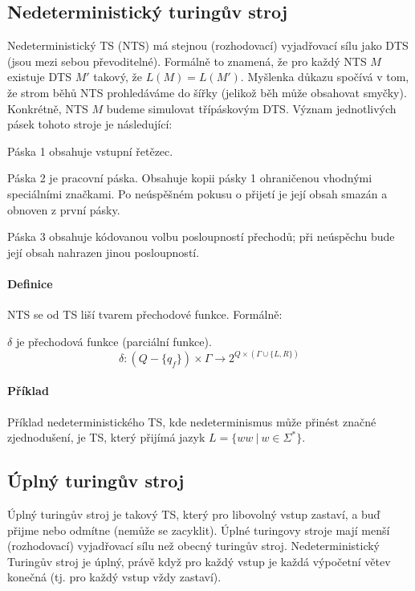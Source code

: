 \subsection{Nedeterministický turingův stroj}

Nedeterministický TS (NTS) má stejnou (rozhodovací) vyjadřovací sílu jako DTS (jsou mezi sebou převoditelné). Formálně to znamená, že pro každý NTS $M$ existuje DTS $M'$ takový, že $L(M) = L(M')$. Myšlenka důkazu spočívá v tom, že strom běhů NTS prohledáváme do šířky (jelikož běh může obsahovat smyčky). Konkrétně, NTS $M$ budeme simulovat třípáskovým DTS. Význam jednotlivých pásek tohoto
stroje je následující: \begin{compactitem}
    \item Páska 1 obsahuje vstupní řetězec.
    \item Páska 2 je pracovní páska. Obsahuje kopii pásky 1 ohraničenou vhodnými speciálními značkami. Po neúspěšném pokusu o přijetí je její obsah smazán a obnoven z první pásky.
    \item Páska 3 obsahuje kódovanou volbu posloupností přechodů; při neúspěchu bude její obsah nahrazen jinou posloupností.
\end{compactitem}

\paragraph*{Definice} NTS se od TS liší tvarem přechodové funkce. Formálně:

\begin{compactitem}
    \item $\delta$ je přechodová funkce (parciální funkce). $$\delta : (Q - \{ q_f \}) \times \Gamma \rightarrow 2^{Q \times (\Gamma \cup \{ L, R \})}$$
\end{compactitem}

\paragraph*{Příklad} Příklad nedeterministického TS, kde nedeterminismus může přinést značné zjednodušení, je TS, který přijímá jazyk $L = \{ ww ~|~ w \in \Sigma^* \}$.

\subsection{Úplný turingův stroj}

Úplný turingův stroj je takový TS, který pro libovolný vstup zastaví, a buď přijme nebo odmítne (nemůže se zacyklit). Úplné turingovy stroje mají menší (rozhodovací) vyjadřovací sílu než obecný turingův stroj. Nedeterministický Turingův stroj je úplný, právě když pro každý vstup je každá výpočetní větev konečná (tj. pro každý vstup vždy zastaví).

